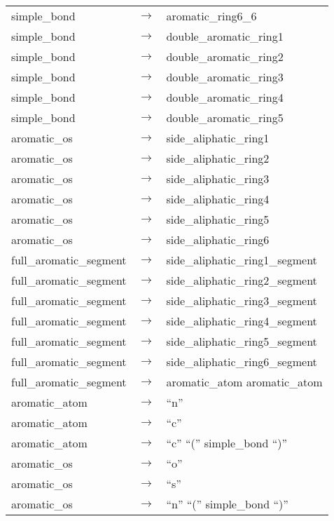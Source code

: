 \begin{longtable}{m{} p{} p{}}
    simple\_bond & $\rightarrow$ & aromatic\_ring6\_6 \\
    simple\_bond & $\rightarrow$ & double\_aromatic\_ring1 \\
    simple\_bond & $\rightarrow$ & double\_aromatic\_ring2 \\
    simple\_bond & $\rightarrow$ & double\_aromatic\_ring3 \\
    simple\_bond & $\rightarrow$ & double\_aromatic\_ring4 \\
    simple\_bond & $\rightarrow$ & double\_aromatic\_ring5 \\
    aromatic\_os & $\rightarrow$ & side\_aliphatic\_ring1 \\
    aromatic\_os & $\rightarrow$ & side\_aliphatic\_ring2 \\
    aromatic\_os & $\rightarrow$ & side\_aliphatic\_ring3 \\
    aromatic\_os & $\rightarrow$ & side\_aliphatic\_ring4 \\
    aromatic\_os & $\rightarrow$ & side\_aliphatic\_ring5 \\
    aromatic\_os & $\rightarrow$ & side\_aliphatic\_ring6 \\
    full\_aromatic\_segment & $\rightarrow$ & side\_aliphatic\_ring1\_segment \\
    full\_aromatic\_segment & $\rightarrow$ & side\_aliphatic\_ring2\_segment \\
    full\_aromatic\_segment & $\rightarrow$ & side\_aliphatic\_ring3\_segment \\
    full\_aromatic\_segment & $\rightarrow$ & side\_aliphatic\_ring4\_segment \\
    full\_aromatic\_segment & $\rightarrow$ & side\_aliphatic\_ring5\_segment \\
    full\_aromatic\_segment & $\rightarrow$ & side\_aliphatic\_ring6\_segment \\
    full\_aromatic\_segment & $\rightarrow$ & aromatic\_atom aromatic\_atom \\
    aromatic\_atom & $\rightarrow$ & ``n'' \\
    aromatic\_atom & $\rightarrow$ & ``c'' \\
    aromatic\_atom & $\rightarrow$ & ``c'' ``('' simple\_bond ``)'' \\
    aromatic\_os & $\rightarrow$ & ``o'' \\
    aromatic\_os & $\rightarrow$ & ``s'' \\
    aromatic\_os & $\rightarrow$ & ``n'' ``('' simple\_bond ``)'' \\

\end{longtable}
